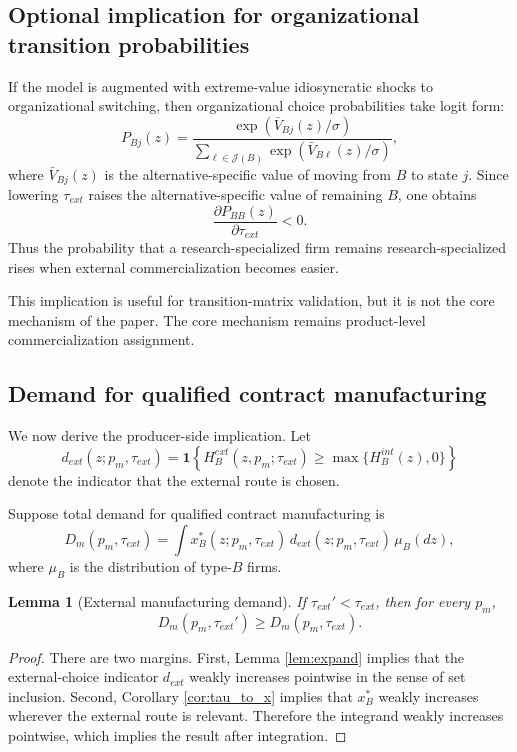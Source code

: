\documentclass[12pt]{article}
\newtheorem{lemma}{Lemma}
\begin{document}
\subsection{Optional implication for organizational transition probabilities}

If the model is augmented with extreme-value idiosyncratic shocks to organizational switching, then organizational choice probabilities take logit form:
\[
P_{Bj}(z)
=
\frac{\exp(\bar V_{Bj}(z)/\sigma)}
{\sum_{\ell\in\mathcal{J}(B)} \exp(\bar V_{B\ell}(z)/\sigma)},
\]
where \(\bar V_{Bj}(z)\) is the alternative-specific value of moving from \(B\) to state \(j\). Since lowering \(\tau_{ext}\) raises the alternative-specific value of remaining \(B\), one obtains
\[
\frac{\partial P_{BB}(z)}{\partial \tau_{ext}}<0.
\]
Thus the probability that a research-specialized firm remains research-specialized rises when external commercialization becomes easier.

This implication is useful for transition-matrix validation, but it is not the core mechanism of the paper. The core mechanism remains product-level commercialization assignment.

\subsection{Demand for qualified contract manufacturing}

We now derive the producer-side implication. Let
\[
d_{ext}(z;p_m,\tau_{ext})
=
\mathbf{1}\left\{
H_B^{ext}(z,p_m;\tau_{ext})
\ge
\max\{H_B^{int}(z),0\}
\right\}
\]
denote the indicator that the external route is chosen.

Suppose total demand for qualified contract manufacturing is
\[
D_m(p_m,\tau_{ext})
=
\int x_B^*(z;p_m,\tau_{ext})\,d_{ext}(z;p_m,\tau_{ext})\,\mu_B(dz),
\]
where \(\mu_B\) is the distribution of type-\(B\) firms.

\begin{lemma}[External manufacturing demand]
\label{lem:demand}
If \(\tau_{ext}'<\tau_{ext}\), then for every \(p_m\),
\[
D_m(p_m,\tau_{ext}')\ge D_m(p_m,\tau_{ext}).
\]
\end{lemma}

\begin{proof}
There are two margins. First, Lemma \ref{lem:expand} implies that the external-choice indicator \(d_{ext}\) weakly increases pointwise in the sense of set inclusion. Second, Corollary \ref{cor:tau_to_x} implies that \(x_B^*\) weakly increases wherever the external route is relevant. Therefore the integrand weakly increases pointwise, which implies the result after integration.
\end{proof}
\end{document}
